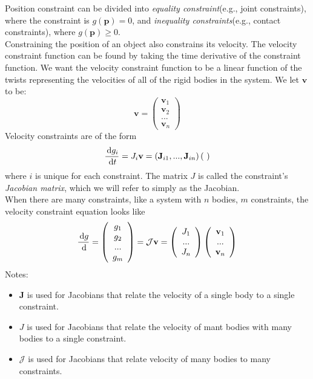         Position constraint can be divided into \textit{equality constraint}(e.g., joint constraints), where the constraint is $g(\mathbf{p}) = 0$, and \textit{inequality constraints}(e.g., contact constraints), where $g(\mathbf{p}) \ge 0$. \\
        Constraining the position of an object also constrains its velocity. The velocity constraint function can be found by taking the time derivative of the constraint function. We want the velocity constraint function to be a linear function of the twists representing the velocities of all of the rigid bodies in the system. We let $\mathbf{v}$ to be:
        \begin{equation}
            \mathbf{v} = \left( \begin{array}{c}\mathbf{v}_1 \\\mathbf{v}_2 \\ ... \\ \mathbf{v}_n \end{array}\right)
        \end{equation}
        Velocity constraints are of the form
        \begin{equation}
            \frac{\,\mathrm{d} g_i}{\,\mathrm{d} t} = J_i \mathbf{v} = (\mathbf{J}_{i1} ,...,\mathbf{J}_{in} )\left(\ \right)
        \end{equation}
        where $i$ is unique for each constraint. The matrix $J$ is called the constraint's \textit{Jacobian matrix}, which we will refer to simply as the Jacobian. \\

        When there are many constraints, like a system with $n$ bodies, $m$ constraints, the velocity constraint equation looks like
        \begin{equation}
            \frac{\,\mathrm{d} g}{\,\mathrm{d}} = \left( \begin{array}{c} g_1 \\g_2 \\ ...\\g_m\end{array}\right)= \mathcal{J}\mathbf{v} = \left( \begin{array}{c} J_1 \\ ... \\ J_n \end{array} \right) \left( \begin{array}{c} \mathbf{v}_1 \\ ... \\ \mathbf{v}_n \end{array} \right)
        \end{equation}
        Notes:
        \begin{itemize}
            \item $\pmb{J}$ is used for Jacobians that relate the velocity of a single body to a single constraint.
            \item $J$ is used for Jacobians that relate the velocity of mant bodies with many bodies to a single constraint.
            \item $\mathcal{J}$ is used for Jacobians that relate velocity of many bodies to many constraints. 
        \end{itemize}

